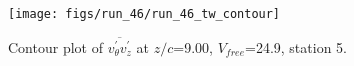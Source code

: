 \begin{figure}[H]
\centering
\texttt{[image: figs/run\_46/run\_46\_tw\_contour]}
\caption{Contour plot of $\overline{v_{\theta}^{\prime} v_{z}^{\prime}}$ at $z/c$=9.00, $V_{free}$=24.9, station 5.}
\label{fig:run_46_tw_contour}
\end{figure}


